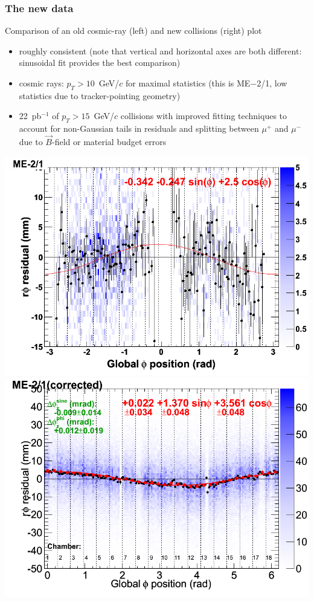 \documentclass[compress]{beamer}
\begin{document}
\begin{frame}
\frametitle{The new data}

Comparison of an old cosmic-ray (left) and new collisions (right) plot
\begin{itemize}
\item roughly consistent (note that vertical and horizontal axes are both different: sinusoidal fit provides the best comparison)
\item cosmic rays: $p_T > 10$~GeV/$c$ for maximal statistics (this is
  ME$-$2/1, low statistics due to tracker-pointing geometry)
\item 22~pb$^{-1}$ of $p_T > 15$~GeV/$c$ collisions with improved
  fitting techniques to account for non-Gaussian tails in residuals
  and splitting between $\mu^+$ and $\mu^-$ due to $\vec{B}$-field or
  material budget errors
\end{itemize}

\vfill
\includegraphics[width=0.5\linewidth]{cosmics_mem21.png}
\includegraphics[width=0.5\linewidth]{one_and_only_mapplot.png}
\end{frame}
\end{document}
